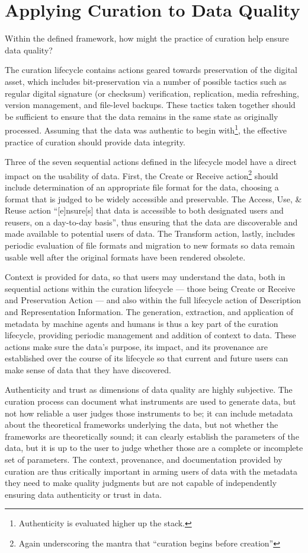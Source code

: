 \documentclass{acm_proc_article-sp}
\begin{document}
\section{Applying Curation to Data Quality}

Within the defined framework, how might the practice of curation
help ensure data quality?

The curation lifecycle \cite{dcc:lifecycle} contains actions geared
towards preservation of the digital asset, which includes
bit-preservation via a number of possible tactics such as regular
digital signature (or checksum) verification, replication, media
refreshing, version management, and file-level backups. These tactics
taken together should be sufficient to ensure that the data remains in
the same state as originally processed. Assuming that the data was
authentic to begin with\footnote{Authenticity is evaluated higher up
  the stack.}, the effective practice of curation should provide data
integrity.

Three of the seven sequential actions defined in the lifecycle model
have a direct impact on the usability of data. First, the Create or
Receive action\footnote{Again underscoring the mantra that ``curation
  begins before creation''} should include determination of an
appropriate file format for the data, choosing a format that is judged
to be widely accessible and preservable. The Access, Use, \& Reuse
action ``[e]nsure[s] that data is accessible to both designated users
and reusers, on a day-to-day basis'', thus ensuring that the data are
discoverable and made available to potential users of data. The
Transform action, lastly, includes periodic evaluation of file formats
and migration to new formats so data remain usable well after the
original formats have been rendered obsolete.

Context is provided for data, so that users may understand the data,
both in sequential actions within the curation lifecycle --- those
being Create or Receive and Preservation Action --- and also within
the full lifecycle action of Description and Representation
Information. The generation, extraction, and application of metadata
by machine agents and humans is thus a key part of the curation
lifecycle, providing periodic management and addition of context to
data.  These actions make sure the data's purpose, its impact, and its
provenance are established over the course of its lifecycle so that
current and future users can make sense of data that they have
discovered.

Authenticity and trust as dimensions of data quality are highly
subjective.  The curation process can document what instruments are
used to generate data, but not how reliable a user judges those
instruments to be; it can include metadata about the theoretical
frameworks underlying the data, but not whether the frameworks are
theoretically sound; it can clearly establish the parameters of the
data, but it is up to the user to judge whether those are a complete
or incomplete set of parameters. The context, provenance, and
documentation provided by curation are thus critically important in
arming users of data with the metadata they need to make quality
judgments but are not capable of independently ensuring data
authenticity or trust in data.
\end{document}
